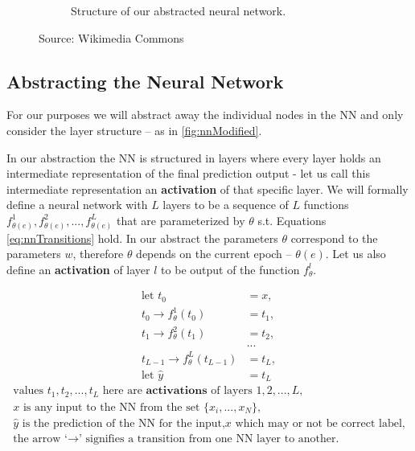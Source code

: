 \documentclass[dissertation.tex]{subfiles}
\begin{document}
\begin{figure}[H]
\begin{subfigure}[t]{0.49\textwidth}
    \caption{
      Structure of our abstracted neural network.
    }
    \label{fig:nnModified}
  \end{subfigure}
    \caption{
      Source: Wikimedia Commons 
    }
\end{figure}

\subsection{Abstracting the Neural Network}
For our purposes we will abstract away the individual nodes in the NN and only
consider the layer structure -- as in \autoref{fig:nnModified}.

In our abstraction the NN is structured in layers where every layer holds
an intermediate representation of the final prediction output - let us call this
intermediate representation an \textbf{activation} of that specific layer.
We will formally define a neural network with $L$ layers to be a sequence of $L$
functions $f_{\theta(e)}^1,f_{\theta(e)}^2,...,f_{\theta(e)}^L$ that are
parameterized by $\theta$ s.t. Equations \ref{eq:nnTransitions} hold.
In our abstract the parameters $\theta$ correspond to the parameters $w$,
therefore $\theta$ depends on the current epoch -- $\theta(e)$.
Let us also define an \textbf{activation} of layer $l$ to be output of the
function $f_\theta^l$.

\vbox{
\begin{align}
	\text{let } t_0 &= x, \nonumber \\
  t_0 \rightarrow f_{\theta}^1(t_0) &= t_1, \nonumber \\
  t_1 \rightarrow f_{\theta}^2(t_1) &= t_2, \nonumber \\
  &... \nonumber \\
  t_{L-1} \rightarrow f_{\theta}^L(t_{L-1}) &= t_L, \nonumber\\
  \text{let } \hat{y} &= t_L \label{eq:nnTransitions}
\end{align}
\vspace*{-\baselineskip}
\vspace*{-\baselineskip}
\begin{gather}
  \text{values } t_1,t_2,...,t_L 
  \text{ here are } \textbf{activations } \text{of layers } 1,2,...,L,
	\nonumber\\
	x \text{ is any input to the NN from the set } \{x_i,...,x_N\}, \nonumber\\
	\hat{y} \text{ is the prediction of the NN for the input,} x
	\text{ which may or not be correct label,} \nonumber\\
	\text{the arrow `}\rightarrow\text{' signifies a transition from one NN layer to another.}
	\nonumber
\end{gather}
}
\end{document}
